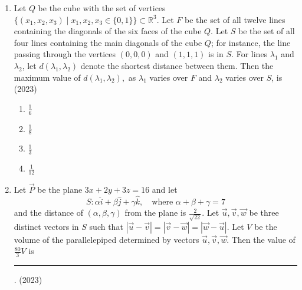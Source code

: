 \begin{enumerate}[label=\thesubsection.\arabic*.,ref=\thesubsection.\theenumi]
$$\myvec{
0 &-c_3& c_2\\
c_3&0&-c_1\\
-c_2&c_1&0 
}
\myvec{
1 \\
b_2 \\
b_3}
    =
\myvec{
3 - c_1\\
1 - c_2 \\
-1 - c_3}
$$
Then, which of the following statements is/are TRUE?
\hfill (2022)  
\begin{multicols}{4}     \begin{enumerate}
	\item $\vec{\overrightarrow{a}} \cdot \vec{\overrightarrow{c}}$ = 0
 	    \item $\vec{\overrightarrow{b}} \cdot \vec{\overrightarrow{c}}$ = 0
 	    \item $|\vec{\overrightarrow{b}}| > \sqrt{10}$
 	    \item $|\vec{\overrightarrow{c}}| \leq \sqrt{11}$
\end{enumerate} \end{multicols}
  \item Let $Q$ be the cube with the set of vertices $ \{(x_1, x_2, x_3) \mid x_1, x_2, x_3 \in \{0,1\} \} \subset \mathbb{R}^3$. Let $F$ be the set of all twelve lines containing the diagonals of the six faces of the cube $Q$. Let $S$ be the set of all four lines containing the main diagonals of the cube $Q$; for instance, the line passing through the vertices $(0,0,0)$ and $(1,1,1)$ is in $S$. For lines $\lambda_1$ and $\lambda_2$, let $ d(\lambda_1, \lambda_2) $ denote the shortest distance between them. Then the maximum value of $ d(\lambda_1, \lambda_2), $ as $\lambda_1$ varies over $F$ and $\lambda_2$ varies over $S$, is 
\hfill (2023)    
\begin{multicols}{4}     
\begin{enumerate}
 \item $\frac{1}{6}$
 \item $\frac{1}{8}$
 \item $\frac{1}{3}$
 \item $\frac{1}{12}$
\end{enumerate}
\end{multicols}
%
 \item Let $\vec{P}$ be the plane $3x + 2y + 3z = 16$ and let 
$$
S : \alpha \hat{i} + \beta \hat{j} + \gamma \hat{k}, \quad \text{where } \alpha + \beta + \gamma = 7
$$
and the distance of $(\alpha, \beta, \gamma)$ from the plane is $\frac{2}{\sqrt{22}}$.
Let $\vec{u}, \vec{v}, \vec{w}$ be three distinct vectors in $S$ such that $|\vec{u} - \vec{v}| = |\vec{v} - \vec{w}| = |\vec{w} - \vec{u}|$. Let $V$ be the volume of the parallelepiped determined by vectors $\vec{u}, \vec{v}, \vec{w}$. Then the value of $\frac{80}{3} V$ is
\rule{1cm}{0.1pt}.
\hfill (2023)
\end{enumerate}
